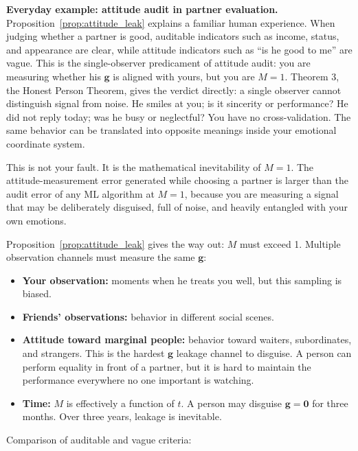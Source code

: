 \documentclass[12pt,a4paper]{article}
\theoremstyle{remark}
\begin{document}
\textbf{Everyday example: attitude audit in partner evaluation.} Proposition~\ref{prop:attitude_leak} explains a familiar human experience. When judging whether a partner is good, auditable indicators such as income, status, and appearance are clear, while attitude indicators such as ``is he good to me'' are vague. This is the single-observer predicament of attitude audit: you are measuring whether his $\mathbf{g}$ is aligned with yours, but you are $M=1$. Theorem 3, the Honest Person Theorem, gives the verdict directly: a single observer cannot distinguish signal from noise. He smiles at you; is it sincerity or performance? He did not reply today; was he busy or neglectful? You have no cross-validation. The same behavior can be translated into opposite meanings inside your emotional coordinate system.

This is not your fault. It is the mathematical inevitability of $M=1$. The attitude-measurement error generated while choosing a partner is larger than the audit error of any ML algorithm at $M=1$, because you are measuring a signal that may be deliberately disguised, full of noise, and heavily entangled with your own emotions.

Proposition~\ref{prop:attitude_leak} gives the way out: $M$ must exceed 1. Multiple observation channels must measure the same $\mathbf{g}$:

\begin{itemize}
    \item \textbf{Your observation:} moments when he treats you well, but this sampling is biased.
    \item \textbf{Friends' observations:} behavior in different social scenes.
    \item \textbf{Attitude toward marginal people:} behavior toward waiters, subordinates, and strangers. This is the hardest $\mathbf{g}$ leakage channel to disguise. A person can perform equality in front of a partner, but it is hard to maintain the performance everywhere no one important is watching.
    \item \textbf{Time:} $M$ is effectively a function of $t$. A person may disguise $\mathbf{g} = \mathbf{0}$ for three months. Over three years, leakage is inevitable.
\end{itemize}

Comparison of auditable and vague criteria:
\end{document}
